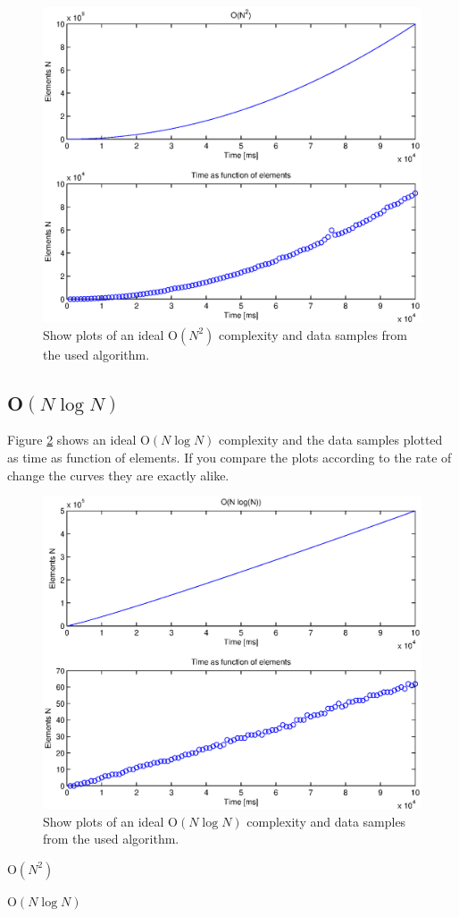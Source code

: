 \begin{figure}[th!]
\centering
\includegraphics[width=1\textwidth]{./graphics/test1.eps}
\caption{Show plots of an ideal O\(\left( { N }^{ 2 } \right)\) complexity and data samples from the used algorithm.}

\label{fig:test1}
\end{figure}
\newpage


\subsection{O\(\left( N\log {N }  \right) \)}
Figure \ref{fig:test2} shows an ideal O\(\left( N\log {N }  \right) \) complexity and the data samples plotted as time as function of elements. If you compare the plots according to the rate of change the curves they are exactly alike. 



\begin{figure}[th!]
\centering
\includegraphics[width=1\textwidth]{./graphics/test2.eps}
\caption{Show plots of an ideal O\(\left( N\log {N }  \right) \) complexity and data samples from the used algorithm.}
\label{fig:test2}
\end{figure}



O\(\left( { N }^{ 2 } \right)\)

O\(\left( N\log {N }  \right) \)
